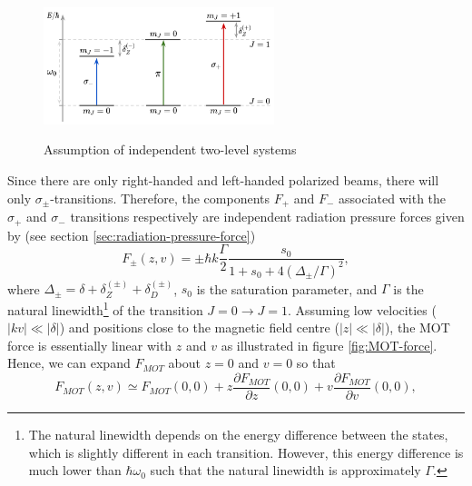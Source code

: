 \begin{figure}[!ht]
	\centering
	\caption{Assumption of independent two-level systems}
	\includegraphics[width=0.6\textwidth]{USPSC-img/Independent-two-level-system.png}
	\label{fig:independent-two-level-system}
\end{figure}

Since there are only right-handed and left-handed polarized beams, there will only $ \sigma_{\pm} $-transitions. Therefore, the components $ F_{+} $ and $ F_{-} $ associated with the $ \sigma_{+} $ and $ \sigma_{-} $ transitions respectively are independent radiation pressure forces given by (see section \ref{sec:radiation-pressure-force})
\begin{equation}
	F_{\pm}(z, v) = \pm \hbar k \frac{\Gamma}{2} \frac{s_0}{1 + s_0 + 4(\Delta_{\pm} / \Gamma)^2},
	\label{eq:1D-MOT-force-components}
\end{equation}
where $ \Delta_{\pm} = \delta + \delta_{Z}^{(\pm)} + \delta_{D}^{(\pm)} $, $ s_0 $ is the saturation parameter, and $ \Gamma $ is the natural linewidth\footnote{The natural linewidth depends on the energy difference between the states, which is slightly different in each transition. However, this energy difference is much lower than $ \hbar \omega_0 $ such that the natural linewidth is approximately $ \Gamma $.} of the transition $ J = 0 \rightarrow J = 1 $. Assuming low velocities ($ |kv| \ll |\delta| $) and positions close to the magnetic field centre ($ |z| \ll |\delta| $), the MOT force is essentially linear with $ z $ and $ v $ as illustrated in figure \ref{fig:MOT-force}. Hence, we can expand $ F_{MOT} $ about $ z = 0 $ and $ v = 0 $ so that
\begin{equation}
	F_{MOT}(z, v) \simeq F_{MOT}(0, 0) + z \frac{\partial F_{MOT}}{\partial z}(0, 0) + v \frac{\partial F_{MOT}}{\partial v}(0, 0),
	\label{eq:MOT-force-Taylor-expansion}
\end{equation}

